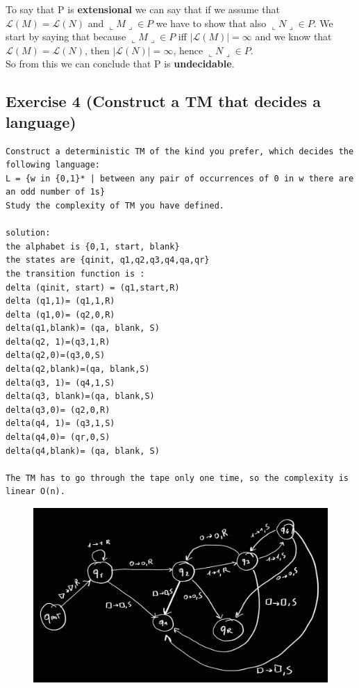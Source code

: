 To say that P is \textbf{extensional} we can say that if we assume that \(\mathcal{L}(M) = \mathcal{L}(N)\) and \(\llcorner M\lrcorner \in P\) we have to show that also \(\llcorner N \lrcorner \in P\). We start by saying that because \(\llcorner M\lrcorner \in P\) iff \(|\mathcal{L}(M)|=\infty\) and we know that   \(\mathcal{L}(M) = \mathcal{L}(N)\), then \(|\mathcal{L}(N)|=\infty\), hence \(\llcorner N \lrcorner \in P\).\\
So from this we can conclude that P is \textbf{undecidable}.

\subsection{Exercise 4 (Construct a TM that decides a language)}
\begin{lstlisting}[breaklines]
Construct a deterministic TM of the kind you prefer, which decides the following language:
L = {w in {0,1}* | between any pair of occurrences of 0 in w there are an odd number of 1s}
Study the complexity of TM you have defined.

solution:
the alphabet is {0,1, start, blank}
the states are {qinit, q1,q2,q3,q4,qa,qr}
the transition function is :
delta (qinit, start) = (q1,start,R)
delta (q1,1)= (q1,1,R)
delta (q1,0)= (q2,0,R)
delta(q1,blank)= (qa, blank, S)
delta(q2, 1)=(q3,1,R)
delta(q2,0)=(q3,0,S)
delta(q2,blank)=(qa, blank,S)
delta(q3, 1)= (q4,1,S)
delta(q3, blank)=(qa, blank,S)
delta(q3,0)= (q2,0,R)
delta(q4, 1)= (q3,1,S)
delta(q4,0)= (qr,0,S)
delta(q4,blank)= (qa, blank, S)

The TM has to go through the tape only one time, so the complexity is linear O(n).
\end{lstlisting}
\begin{figure}[H]
	\centerline{\includegraphics[scale=0.2]{figures/old/TM_1_odd}}
\end{figure}

